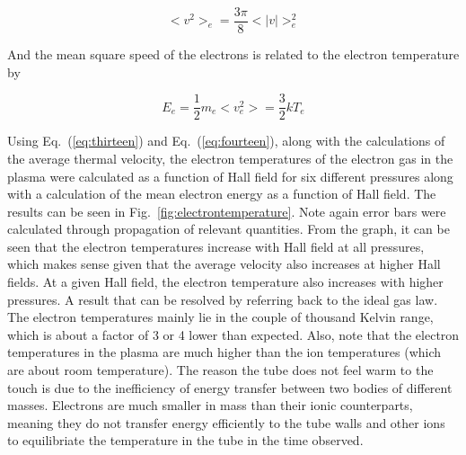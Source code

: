 \documentclass[%
 aip,
rsi,%
 amsmath,amssymb,
 reprint,%
author-numerical,%
]{revtex4-1}
\begin{document}
\begin{equation}
<  v^2  > _ { e }=\frac{3\pi}{8}< | v | > _ { e }^2
\label{eq:thirteen}
\end{equation}

And the mean square speed of the electrons is related to the electron temperature by 

\begin{equation}
E _ { e } = \frac { 1 } { 2 } m _ { e } < v _ { e } ^ { 2 } > = \frac { 3 } { 2 } k T _ { e }
\label{eq:fourteen}
\end{equation}

Using Eq.~(\ref{eq:thirteen}) and Eq.~(\ref{eq:fourteen}), along with the calculations of the average thermal velocity, the electron temperatures of the electron gas in the plasma were calculated as a function of Hall field for six different pressures along with a calculation of the mean electron energy as a function of Hall field. The results can be seen in Fig.~\ref{fig:electrontemperature}. Note again error bars were calculated through propagation of relevant quantities. \newline
\indent From the graph, it can be seen that the electron temperatures increase with Hall field at all pressures, which makes sense given that the average velocity also increases at higher Hall fields. At a given Hall field, the electron temperature also increases with higher pressures. A result that can be resolved by referring back to the ideal gas law. \newline
\noindent The electron temperatures mainly lie in the couple of thousand Kelvin range, which is about a factor of 3 or 4 lower than expected. Also, note that the electron temperatures in the plasma are much higher than the ion temperatures (which are about room temperature). The reason the tube does not feel warm to the touch is due to the inefficiency of energy transfer between two bodies of different masses. Electrons are much smaller in mass than their ionic counterparts, meaning they do not transfer energy efficiently to the tube walls and other ions to equilibriate the temperature in the tube in the time observed. 
\end{document}
